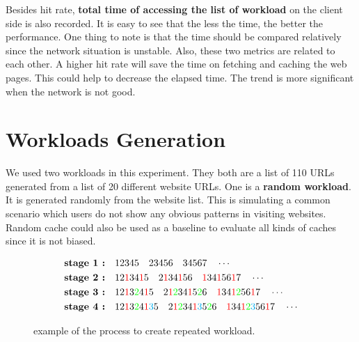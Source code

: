 \documentclass[paper=a4, fontsize=11pt]{scrartcl} %
\numberwithin{equation}{section} %
\numberwithin{figure}{section} %
\numberwithin{table}{section} %
\begin{document}
\vspace{1em}

Besides hit rate, \textbf{total time of accessing the list of workload}
on the client side is also recorded. It is easy to see that the less the time, the better the performance. One thing to note is that the time should be compared relatively since the network situation is unstable.
Also, these two metrics are related to each other. A higher hit rate will save the time on fetching and caching the web pages. This could help to decrease the elapsed time. The trend is more significant when the network is not good. 

\section{Workloads Generation}

We used two workloads in this experiment. They both are a list of 110 URLs generated from a list of 20 different website URLs. One is a 
\textbf{random workload}. It is generated randomly from the website list. This is simulating a common scenario which users do not show any obvious patterns in visiting websites. Random cache could also be used as a baseline to evaluate all kinds of caches since it is not biased. 

\vspace{0.5em}
\begin{figure}[h]
  \centering
  \begin{align*}
    \textbf{stage 1 :} \quad & 
    1 2 3 4 5 \quad 2 3 4 5 6 \quad 3 4 5 6 7 \quad \cdots \\
    \textbf{stage 2 :} \quad & 
    1 2 {\color{red} 1}34{\color{red} 1}5 \quad 
    2 {\color{red} 1}3 4 {\color{red} 1}5 6 \quad 
    {\color{red} 1} 3 4 {\color{red} 1}5 6 {\color{red} 1}7 \quad \cdots \\
    \textbf{stage 3 :} \quad & 
    1 2 {\color{red} 1}3{\color{green} 2}4{\color{red} 1}5 \quad 
    2 {\color{red} 1} {\color{green} 2}3 4 {\color{red} 1}5 
    {\color{green} 2}6 \quad 
    {\color{red} 1} 3 4 {\color{red} 1}{\color{green} 2}5 6 {\color{red} 1}7 \quad \cdots \\
    \textbf{stage 4 :} \quad &
    1 2 {\color{red} 1}3{\color{green} 2}4{\color{red} 1}
    {\color{cyan} 3}5 \quad 
    2 {\color{red} 1} {\color{green} 2}3 4 {\color{red} 1}{\color{cyan} 3}5 
    {\color{green} 2}6 \quad 
    {\color{red} 1} 3 4 {\color{red} 1}{\color{green} 2}{\color{cyan} 3}5 6 {\color{red} 1}7 \quad \cdots
  \end{align*}
  \caption{example of the process to create repeated workload.}
  \label{fig:wl}
\end{figure}
\end{document}
